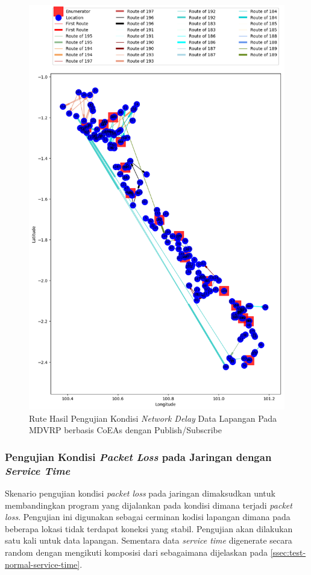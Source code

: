 \begin{figure}[H]
	\centering
	\includegraphics[width=\textwidth]{Resources/Images/test_result_normal_field_m15_n182_delay_pubsub_coes}
	\caption{Rute Hasil Pengujian Kondisi \textit{Network Delay} Data Lapangan Pada MDVRP berbasis CoEAs dengan Publish/Subscribe}
	\label{fig:test_result_network_delay_field_comparison}
\end{figure}


\subsubsection{Pengujian Kondisi \textit{Packet Loss} pada Jaringan dengan \textit{Service Time}}
Skenario pengujian kondisi \textit{packet loss} pada jaringan dimaksudkan untuk membandingkan program yang dijalankan pada kondisi dimana terjadi \textit{packet loss}. Pengujian ini digunakan sebagai cerminan kodisi lapangan dimana pada beberapa lokasi tidak terdapat koneksi yang stabil. Pengujian akan dilakukan satu kali untuk data lapangan. Sementara data \textit{service time} digenerate secara random dengan mengikuti komposisi dari \citep{sudman_time_1965} sebagaimana dijelaskan pada \autoref{ssec:test-normal-service-time}.


